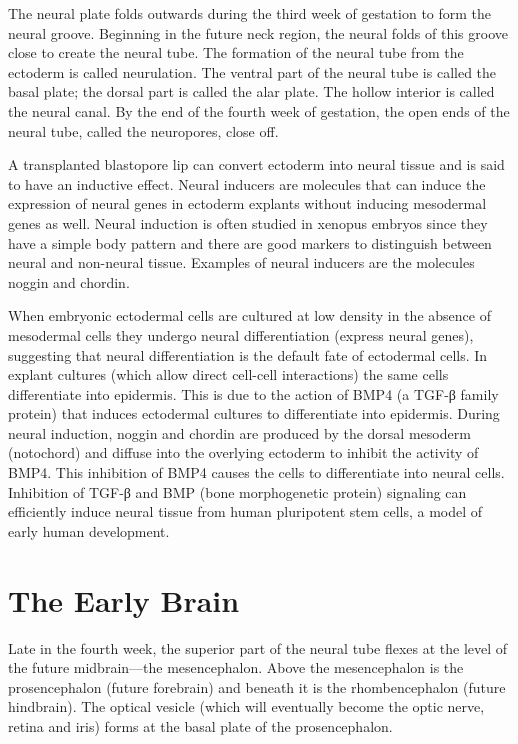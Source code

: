The neural plate folds outwards during the third week of gestation to form the neural groove. Beginning in the future neck region, the neural folds of this groove close to create the neural tube. The formation of the neural tube from the ectoderm is called neurulation. The ventral part of the neural tube is called the basal plate; the dorsal part is called the alar plate. The hollow interior is called the neural canal. By the end of the fourth week of gestation, the open ends of the neural tube, called the neuropores, close off.

A transplanted blastopore lip can convert ectoderm into neural tissue and is said to have an inductive effect. Neural inducers are molecules that can induce the expression of neural genes in ectoderm explants without inducing mesodermal genes as well. Neural induction is often studied in xenopus embryos since they have a simple body pattern and there are good markers to distinguish between neural and non-neural tissue. Examples of neural inducers are the molecules noggin and chordin.

When embryonic ectodermal cells are cultured at low density in the absence of mesodermal cells they undergo neural differentiation (express neural genes), suggesting that neural differentiation is the default fate of ectodermal cells. In explant cultures (which allow direct cell-cell interactions) the same cells differentiate into epidermis. This is due to the action of BMP4 (a TGF-β family protein) that induces ectodermal cultures to differentiate into epidermis. During neural induction, noggin and chordin are produced by the dorsal mesoderm (notochord) and diffuse into the overlying ectoderm to inhibit the activity of BMP4. This inhibition of BMP4 causes the cells to differentiate into neural cells. Inhibition of TGF-β and BMP (bone morphogenetic protein) signaling can efficiently induce neural tissue from human pluripotent stem cells, a model of early human development.

\hypertarget{the-early-brain}{%
\section{The Early Brain}\label{the-early-brain}}

Late in the fourth week, the superior part of the neural tube flexes at the level of the future midbrain---the mesencephalon. Above the mesencephalon is the prosencephalon (future forebrain) and beneath it is the rhombencephalon (future hindbrain). The optical vesicle (which will eventually become the optic nerve, retina and iris) forms at the basal plate of the prosencephalon.

